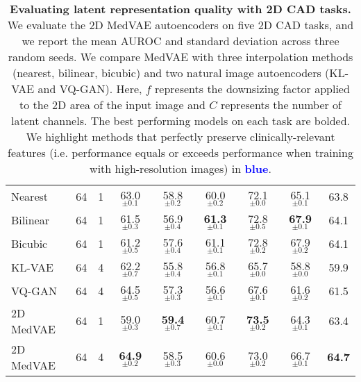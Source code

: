 \begin{table*}[t]
{{\begin{tabular}{ lcccccccc }
\small Nearest & 64 & 1    & 63.0$_{\pm0.1}$ & 58.8$_{\pm0.2}$ & 60.0$_{\pm0.2}$ & 72.1$_{\pm0.0}$  & 65.1$_{\pm0.1}$ & 63.8	\\
\small Bilinear & 64 & 1   & 61.5$_{\pm0.3}$ & 56.9$_{\pm0.4}$ & \textbf{61.3$_{\pm0.1}$} & 72.8$_{\pm0.5}$  & \textbf{67.9$_{\pm0.1}$} & 64.1\\
\small Bicubic & 64 & 1   & 61.2$_{\pm0.5}$ & 57.6$_{\pm0.4}$ & 61.1$_{\pm0.1}$ & 72.8$_{\pm0.2}$  & 67.9$_{\pm0.2}$ & 64.1\\
\small KL-VAE & 64 & 4   & 62.2$_{\pm0.7}$ &  55.8$_{\pm0.4}$ & 56.8$_{\pm0.1}$ & 65.7$_{\pm0.0}$ & 58.8$_{\pm0.0}$ & 59.9\\
\small VQ-GAN & 64 & 4    & 64.5$_{\pm0.5}$ & 57.3$_{\pm0.3}$ &  56.6$_{\pm0.1}$ & 67.6$_{\pm0.1}$  & 61.6$_{\pm0.2}$ & 61.5 \\
\small 2D MedVAE & 64 & 1  & 59.0$_{\pm0.3}$ & \textbf{59.4$_{\pm0.7}$} & 60.7$_{\pm0.1}$ & \textbf{73.5$_{\pm0.2}$} & 64.3$_{\pm0.1}$ & 63.4\\
\small 2D MedVAE & 64 & 4   & \textbf{64.9$_{\pm0.2}$} &  58.5$_{\pm0.3}$ & 60.6$_{\pm0.0}$ & 73.0$_{\pm0.2}$ & 66.7$_{\pm0.1}$ & \textbf{64.7}\\

\bottomrule
\end{tabular}
}
}
\caption{\textbf{Evaluating latent representation quality with 2D CAD tasks.} We evaluate the 2D MedVAE autoencoders on five 2D CAD tasks, and we report the mean AUROC and standard deviation across three random seeds. We compare MedVAE with three interpolation methods (nearest, bilinear, bicubic) and two natural image autoencoders (KL-VAE and VQ-GAN). Here, $f$ represents the downsizing factor applied to the 2D area of the input image and $C$ represents the number of latent channels. The best performing models on each task are bolded. We highlight methods that perfectly preserve clinically-relevant features (i.e. performance equals or exceeds performance when training with high-resolution images) in \textcolor{blue}{\textbf{blue}}.}
\label{table:image_classification}
\vspace{-1mm}
\end{table*}


